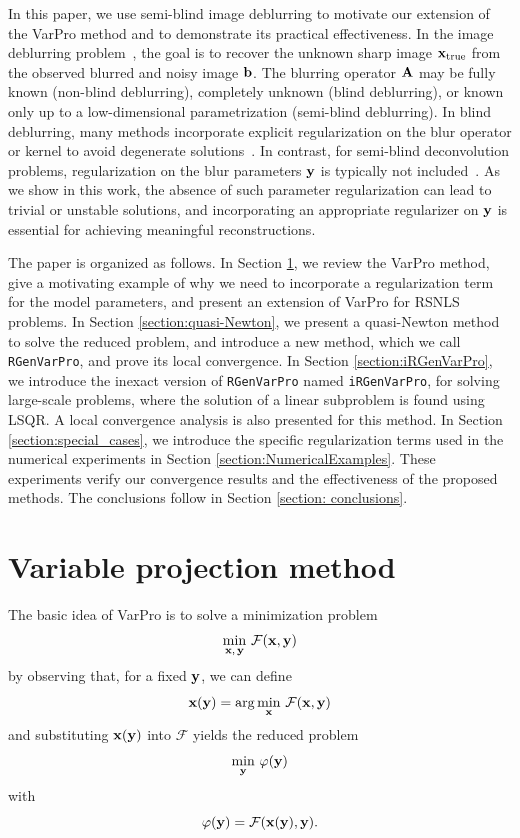 \documentclass[onefignum,onetabnum]{siamart171218}
\newcommand{\bA}{{\bf A}}
\newcommand{\bb}{{\bf b}}
\newcommand{\bx}{{\bf x}}
\newcommand{\by}{{\bf y}}
\newcommand{\calF}{\mathcal{F}}
\begin{document}
In this paper, we use semi-blind image deblurring to motivate our extension of the VarPro method and to demonstrate its practical effectiveness. In the image deblurring problem~\cite{austin2022image, espanol2009multilevel, deblurring}, the goal is to recover the unknown sharp image $\bx_{\rm true}$ from the observed blurred and noisy image $\bb$. The blurring operator $\bA$ may be fully known (non-blind deblurring), completely unknown (blind deblurring), or known only up to a low-dimensional parametrization (semi-blind deblurring). In blind deblurring, many methods incorporate explicit regularization on the blur operator or kernel to avoid degenerate solutions~\cite{chan1998total, dykes2021lanczos, levin2009understanding}. In contrast, for semi-blind deconvolution problems, regularization on the blur parameters $\by$ is typically not included~\cite{buccini2018semiblind, chung2010efficient, cornelio2014constrained, espanol2025local, Espanol_2023, gazzola2021regularization}. As we show in this work, the absence of such parameter regularization can lead to trivial or unstable solutions, and incorporating an appropriate regularizer on $\by$ is essential for achieving meaningful reconstructions.

The paper is organized as follows. In Section \ref{sec:varpro}, we review the VarPro method, give a motivating example of why we need to incorporate a regularization term for the model parameters, and present an extension of VarPro for RSNLS problems. In Section \ref{section:quasi-Newton}, we present a quasi-Newton method to solve the reduced problem, and introduce a new method, which we call \texttt{RGenVarPro}, and prove its local convergence. In Section \ref{section:iRGenVarPro}, we introduce the inexact version of \texttt{RGenVarPro} named \texttt{iRGenVarPro}, for solving large-scale problems, where the solution of a linear subproblem is found using LSQR. A local convergence analysis is also presented for this method. In Section \ref{section:special_cases}, we introduce the specific regularization terms used in the numerical experiments in Section \ref{section:NumericalExamples}. These experiments verify our convergence results and the effectiveness of the proposed methods. The conclusions follow in %
Section \ref{section: conclusions}.

\section{Variable projection method}\label{sec:varpro}
The basic idea of VarPro is to solve a minimization problem %
$$\min_{\bx,\,\by}\,\calF(\bx,\by)$$
by observing that, for a fixed \(\by\), we can define
$$\bx(\by) = \arg\min_{\bx}\,\calF(\bx, \by)$$
and substituting $\bx(\by)$ into $\calF$ yields the reduced problem  
\begin{equation}\label{eq: minvarphi}
\min_{\by}\,\varphi(\by)
\end{equation}
 with $$\varphi(\by) = \calF(\bx(\by), \by).$$
 
\end{document}
